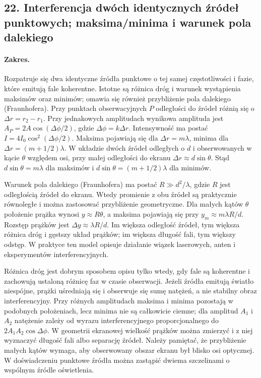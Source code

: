 \documentclass[11pt,a4paper]{article}
\begin{document}
\subsection{22. Interferencja dwóch identycznych źródeł punktowych; maksima/minima i warunek pola dalekiego}
\paragraph{Zakres.} Rozpatruje się dwa identyczne źródła punktowe o tej samej częstotliwości i fazie, które emitują fale koherentne. Istotne są różnica dróg i warunek wystąpienia maksimów oraz minimów; omawia się również przybliżenie pola dalekiego (Fraunhofera). Przy punktach obserwacyjnych $P$ odległości do źródeł różnią się o $\Delta r = r_2-r_1$. Przy jednakowych amplitudach wynikowa amplituda jest $A_P=2A\cos(\Delta\phi/2)$, gdzie $\Delta\phi=k\Delta r$. Intensywność ma postać $I=4I_0\cos^2(\Delta\phi/2)$. Maksima pojawiają się dla $\Delta r = m\lambda$, minima dla $\Delta r=(m+1/2)\lambda$. W układzie dwóch źródeł odległych o $d$ i obserwowanych w kącie $\theta$ względem osi, przy małej odległości do ekranu $\Delta r\approx d\sin\theta$. Stąd $d\sin\theta=m\lambda$ dla maksimów i $d\sin\theta=(m+1/2)\lambda$ dla minimów.\par
Warunek pola dalekiego (Fraunhofera) ma postać $R\gg d^2/\lambda$, gdzie $R$ jest odległością źródeł do ekranu. Wtedy promienie z obu źródeł są praktycznie równoległe i można zastosować przybliżenie geometryczne. Dla małych kątów $\theta$ położenie prążka wynosi $y\approx R\theta$, a maksima pojawiają się przy $y_m\approx m\lambda R/d$. Rozstęp prążków jest $\Delta y\approx\lambda R/d$. Im większa odległość źródeł, tym większa różnica dróg i gęstszy układ prążków; im większa długość fali, tym większy odstęp. W praktyce ten model opisuje działanie wiązek laserowych, anten i eksperymentów interferencyjnych.\par

Różnica dróg jest dobrym sposobem opisu tylko wtedy, gdy fale są koherentne i zachowują ustaloną różnicę faz w czasie obserwacji. Jeżeli źródła emitują światło niespójne, prążki uśredniają się i obserwuje się sumę natężeń, a nie stabilny obraz interferencyjny. Przy różnych amplitudach maksima i minima pozostają w podobnych położeniach, lecz minima nie są całkowicie ciemne; dla amplitud $A_1$ i $A_2$ natężenie zależy od wyrazu interferencyjnego proporcjonalnego do $2A_1A_2\cos\Delta\phi$. W geometrii ekranowej wielkość prążków można zmierzyć i z niej wyznaczyć długość fali albo separację źródeł. Należy pamiętać, że przybliżenie małych kątów wymaga, aby obserwowany obszar ekranu był blisko osi optycznej. W doświadczeniu punktowe źródła można zastąpić dwiema szczelinami o wspólnym źródle oświetlenia.
\par
\end{document}
